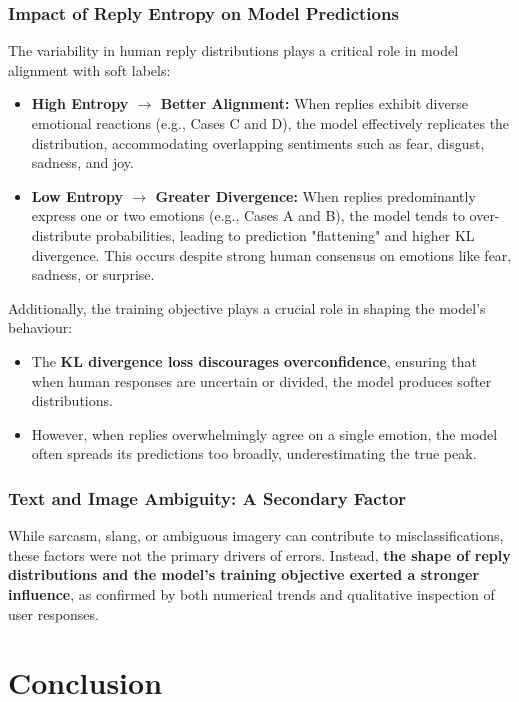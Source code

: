 \subsubsection*{Impact of Reply Entropy on Model Predictions}
The variability in human reply distributions plays a critical role in model alignment with soft labels:
\begin{itemize}
    \item \textbf{High Entropy $\rightarrow$ Better Alignment:} When replies exhibit diverse emotional reactions (e.g., Cases C and D), the model effectively replicates the distribution, accommodating overlapping sentiments such as fear, disgust, sadness, and joy.
    \item \textbf{Low Entropy $\rightarrow$ Greater Divergence:} When replies predominantly express one or two emotions (e.g., Cases A and B), the model tends to over-distribute probabilities, leading to prediction "flattening" and higher KL divergence. This occurs despite strong human consensus on emotions like fear, sadness, or surprise.
\end{itemize}

Additionally, the training objective plays a crucial role in shaping the model’s behaviour:
\begin{itemize}
    \item The \textbf{KL divergence loss discourages overconfidence}, ensuring that when human responses are uncertain or divided, the model produces softer distributions.
    \item However, when replies overwhelmingly agree on a single emotion, the model often spreads its predictions too broadly, underestimating the true peak.
\end{itemize}

\subsubsection*{Text and Image Ambiguity: A Secondary Factor}
While sarcasm, slang, or ambiguous imagery can contribute to misclassifications, these factors were not the primary drivers of errors. Instead, \textbf{the shape of reply distributions and the model's training objective exerted a stronger influence}, as confirmed by both numerical trends and qualitative inspection of user responses.



\section{Conclusion}
\label{sec:conclusion}

